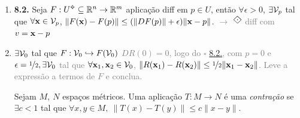 \begin{enumerate}[left = 0.1cm]
\begin{tikzpicture}[scale=1.2, >=to, shift={(10.5cm,1.9cm)}, baseline={(current bounding box.center)}, remember picture, overlay]
\end{tikzpicture}
\- \vspace{-1.8cm}
\item[] \begin{lemma}
    \hypertarget{lemma82}{}
    \textbf{8.2.} Seja \(F:U\ab\subseteq \R^n \to \R^m\) aplicação diff em \(p\in U\), então \(\forall \epsilon >0\), \( \exists \mathcal{V}_p \) tal que \(\forall\textbf{x} \in \mathcal{V}_p\), \(\|F(\textbf{x})- F(p)\| \leq (\|DF(p)\|+\epsilon )\|\textbf{x} - p\|\). \textcolor{gray}{\(\rightarrow \) \(\rotatebox{45}{$\boxdot$}\) diff com \(v= \textbf{x}-p\)} 
\end{lemma}
\item[] \begin{tcolorbox}[colframe=gray, colback=white, boxrule = 0.8pt]
    \centering \(\exists \mathcal{V}_0\) tal que \(F: \mathcal{V}_0 \hookrightarrow F(\mathcal{V}_0)\)  
    \tcblower 
    \textcolor{gray}{\(DR(0)=0\), logo do {\scriptsize \(\square\)} \hyperlink{lemma82}{8.2.}, com \(p=0\) e \(\epsilon = \nicefrac{1}{2}, \exists\mathcal{V}_0\) tal que \(\forall \textbf{x}_1, \textbf{x}_2 \in \mathcal{V}_0\), \(\|R(\textbf{x}_1) - R(\textbf{x}_2)\|\leq \nicefrac{1}{2}\|\textbf{x}_1-\textbf{x}_2\|\). Leve a expressão a termos de \(F\) e conclua.}  
\end{tcolorbox}
\begin{definition}
    Sejam \(M, \ N\) espaços métricos. Uma aplicação \(T:M\to N\) é uma \emph{contração} se \(\exists c<1\) tal que \(\forall x,y \in M, \ \|T(x)- T(y)\|\leq c\|x-y\|\). 
\end{definition}


\end{enumerate}
